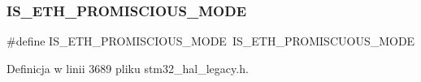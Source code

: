 \subsubsection{\texorpdfstring{I\+S\+\_\+\+E\+T\+H\+\_\+\+P\+R\+O\+M\+I\+S\+C\+I\+O\+U\+S\+\_\+\+M\+O\+DE}{IS\_ETH\_PROMISCIOUS\_MODE}}
{\footnotesize\ttfamily \#define I\+S\+\_\+\+E\+T\+H\+\_\+\+P\+R\+O\+M\+I\+S\+C\+I\+O\+U\+S\+\_\+\+M\+O\+DE~I\+S\+\_\+\+E\+T\+H\+\_\+\+P\+R\+O\+M\+I\+S\+C\+U\+O\+U\+S\+\_\+\+M\+O\+DE}



Definicja w linii 3689 pliku stm32\+\_\+hal\+\_\+legacy.\+h.


